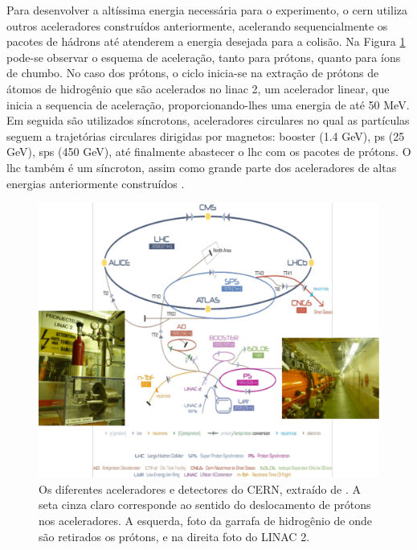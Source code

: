 Para desenvolver a altíssima energia necessária para o experimento, o \gls{cern}
utiliza outros aceleradores construídos anteriormente, acelerando
sequencialmente os pacotes de hádrons até atenderem
a energia desejada para a colisão. Na Figura \ref{fig:esquema_aceleradores} pode-se observar
o esquema de aceleração, tanto para prótons, quanto para íons de chumbo. 
No caso dos prótons, o ciclo inicia-se na extração de prótons de átomos
de hidrogênio que são acelerados no \acrshort{linac} 2, um acelerador linear,
que inicia a sequencia de aceleração, proporcionando-lhes uma energia de até 50 MeV. 
Em seguida são utilizados síncrotons, aceleradores circulares no qual as
partículas seguem a trajetórias circulares dirigidas por magnetos: \acrshort{booster} (1.4
GeV), \acrshort{ps} (25 GeV), \acrshort{sps} (450 GeV), até finalmente 
abastecer o \gls{lhc} com os pacotes de prótons. O \gls{lhc} também é um
síncroton, assim como grande parte dos aceleradores de altas energias anteriormente 
construídos \cite{lecture_slides_1}.

\begin{figure}[h!t]
\centering
\includegraphics[width=\textwidth]{imagens/lhc_garrafa_linac2.pdf}
\caption{Os diferentes aceleradores e detectores do CERN, extraído de
\cite{cern_accelerators}. A seta cinza claro corresponde ao sentido do
deslocamento de prótons nos aceleradores. A esquerda, foto da garrafa
de hidrogênio de onde são retirados os prótons, e na direita foto do LINAC 2.}
\label{fig:esquema_aceleradores}
\end{figure}

